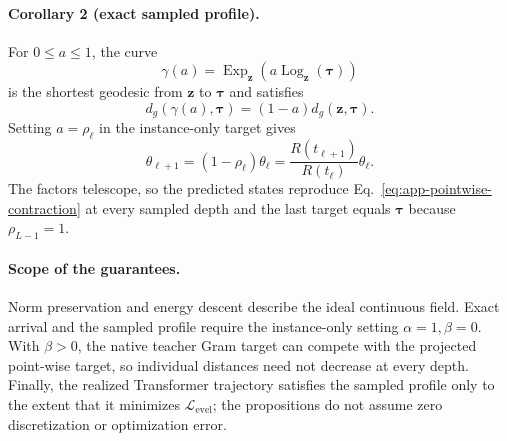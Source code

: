 \paragraph{Corollary 2 (exact sampled profile).}
For $0\leq a\leq1$, the curve
\begin{equation}
    \gamma(a)
    =
    \operatorname{Exp}_{\mathbf{z}}
    \!\left(
        a\operatorname{Log}_{\mathbf{z}}(\boldsymbol{\tau})
    \right)
\end{equation}
is the shortest geodesic from $\mathbf{z}$ to $\boldsymbol{\tau}$ and satisfies
\begin{equation}
    d_g(\gamma(a),\boldsymbol{\tau})
    =
    (1-a)d_g(\mathbf{z},\boldsymbol{\tau}).
    \label{eq:app-slerp-distance}
\end{equation}
Setting $a=\rho_\ell$ in the instance-only target gives
\begin{equation}
    \theta_{\ell+1}
    =
    (1-\rho_\ell)\theta_\ell
    =
    \frac{R(t_{\ell+1})}{R(t_\ell)}\theta_\ell.
    \label{eq:app-discrete-contraction}
\end{equation}
The factors telescope, so the predicted states reproduce
Eq.~\ref{eq:app-pointwise-contraction} at every sampled depth and the last
target equals $\boldsymbol{\tau}$ because $\rho_{L-1}=1$.

\paragraph{Scope of the guarantees.}
Norm preservation and energy descent describe the ideal continuous field.
Exact arrival and the sampled profile require the instance-only setting
$\alpha=1,\beta=0$. With $\beta>0$, the native teacher Gram target can compete
with the projected point-wise target, so individual distances need not decrease
at every depth. Finally, the realized Transformer trajectory satisfies the
sampled profile only to the extent that it minimizes
$\mathcal{L}_{\mathrm{evel}}$; the propositions do not assume zero
discretization or optimization error.
